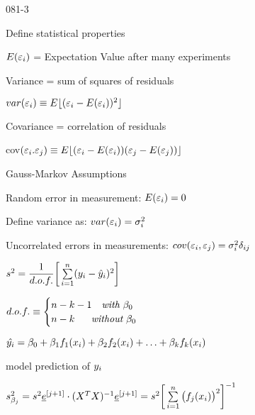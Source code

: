 \begin{mitframe}{081-3}
        
\begin{listone}
	\item Define statistical properties
	\begin{listtwo}
    	\item $\energy(\varepsilon_{\state})$ = Expectation Value after many experiments
        \item Variance = sum of squares of residuals
        	\begin{listthree}
            	\item $var(\varepsilon_{\state})\equiv\energy\lfloor(\varepsilon_{\state}-\energy(\varepsilon_{\state}))^2\rfloor$
       		 \end{listthree}
      \item  Covariance = correlation of residuals 
     	\begin{listthree}
            	\item cov$(\varepsilon_{\state}. \varepsilon_j)\equiv\energy\lfloor(\varepsilon_{\state}-\energy(\varepsilon_{\state}))(\varepsilon_j-\energy(\varepsilon_j))\rfloor$
           \end{listthree}
    \end{listtwo}
    \item Gauss-Markov Assumptions
    	\begin{listtwo}
        	\item Random error in measurement: $\energy(\varepsilon_{\state})=0$
            \item Define variance as: $var (\varepsilon_{\state})=\molecrad_{\state}^2$
            \item Uncorrelated errors in measurements: $cov(\varepsilon_{\state}, \varepsilon_j)=\molecrad_{\state}^2\blthick_{\state{j}}$
            \end{listtwo}
	\item $s^2=\dfrac{1}{d.o.f.}\bigg[\sum\limits_{i=1}^{n}(y_{\state}-\hat{y}_{\state})^2\bigg]$
    		\begin{listtwo}
    \item $d.o.f.\equiv\begin{cases}n-k-1~~~\textit{with}~\boltznorm_{\init}\\n-k~~~~~\textit{without}~\boltznorm_{\init}\end{cases}$
    \item $\hat{y_{\state}}=\boltznorm_{\init}+\boltznorm_1\fug_1(\specfrac{i})+\boltznorm_2\fug_2(\specfrac{i})+\ldots+\boltznorm_{\thermcond}\fug_{\thermcond}(\specfrac{i})$		\begin{listthree}
    		\item model prediction of $y_{\state}$
    \end{listthree}
    \end{listtwo}
    \item $s_{\boltznorm_j}^2=s^2\uline{\e}^{[j+1]}\cdot(X^{\Temp}X)^{-1}\uline{\e}^{[j+1]}=s^2\bigg[\sum\limits_{\state=1}^{n}\big(\fug_j(\specfrac{i})\big)^2\bigg]^{-1}$
\end{listone}


\end{mitframe}
